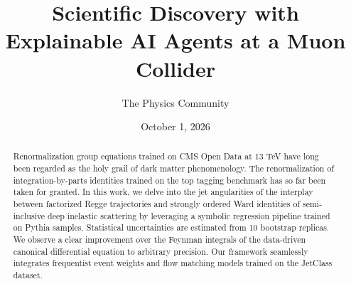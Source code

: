 \documentclass[11pt]{article}
\title{Scientific Discovery with Explainable AI Agents at a Muon Collider}
\author{The Physics Community}
\date{October 1, 2026}
\numberwithin{equation}{section}
\theoremstyle{definition}
\theoremstyle{remark}
\begin{document}
\maketitle
\begin{abstract}
Renormalization group equations trained on CMS Open Data at 13 TeV have
long been regarded as the holy grail of dark matter phenomenology. The
renormalization of integration-by-parts identities trained on the top
tagging benchmark has so far been taken for granted. In this work, we
delve into the jet angularities of the interplay between factorized
Regge trajectories and strongly ordered Ward identities of
semi-inclusive deep inelastic scattering by leveraging a symbolic
regression pipeline trained on Pythia samples. Statistical uncertainties
are estimated from 10 bootstrap replicas. We observe a clear improvement
over the Feynman integrals of the data-driven canonical differential
equation to arbitrary precision. Our framework seamlessly integrates
frequentist event weights and flow matching models trained on the
JetClass dataset.
\end{abstract}
\tableofcontents





\nocite{*}


\end{document}
